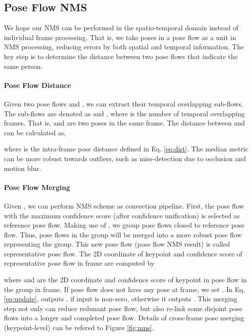 \documentclass{bmvc2k}
\begin{document}
\subsection{Pose Flow NMS}
We hope our NMS can be performed in the spatio-temporal domain instead of individual frame processing. That is, we take poses in a pose flow as a unit in NMS processing, reducing errors by both spatial and temporal information. The key step is to determine the distance between two pose flows that indicate the same person.

\vspace{-4mm}
\paragraph{Pose Flow Distance}
Given two pose flows  and , we can extract their temporal overlapping sub-flows. The sub-flows are denoted as  and , where  is the number of temporal overlapping frames. That is,  and  are two poses in the same frame. The distance between  and  can be calculated as,

where  is the intra-frame pose distance defined in Eq. \ref{eq:dist}. The median metric can be more robust towards outliers, such as miss-detection due to occlusion and motion blur.
\vspace{-3mm}

\paragraph{Pose Flow Merging}
Given , we can perform NMS scheme as convection pipeline. First, the pose flow with the maximum confidence score (after confidence unification) is selected as reference pose flow. Making use of , we group pose flows closed to reference pose flow. Thus, pose flows in the group will be merged into a more robust pose flow representing the group. This new pose flow 
(pose flow NMS result) is called representative pose flow. The 2D coordinate of  keypoint  and confidence score  of representative pose flow in  frame are computed by
\vspace{-2mm}

where  and  are the 2D coordinate and confidence score of  keypoint in  pose flow in the group in  frame. If  pose flow does not have any pose at  frame, we set . In Eq. \ref{eq:update},  outputs , if input is non-zero, otherwise it outputs . This merging step not only can reduce redunant pose flow, but also re-link some disjoint pose flows into a longer and completed pose flow. Details of cross-frame pose merging (keypoint-level) can be refered to Figure \ref{fig:nms}.
\end{document}
